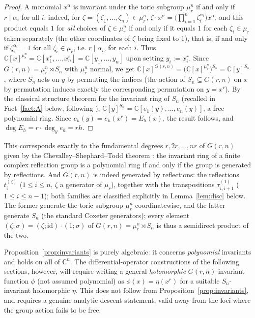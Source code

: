 \documentclass[11pt]{article}
\theoremstyle{remark}
\newcommand{\CC}{\mathbb{C}}
\begin{document}
\begin{proof}
A monomial $x^\alpha$ is invariant under the toric subgroup $\mu_r^n$ if and only if $r\mid \alpha_i$ for all $i$: indeed, for $\zeta=(\zeta_1,\dots,\zeta_n)\in\mu_r^n$, $\zeta\cdot x^\alpha = \big(\prod_{i=1}^n\zeta_i^{\alpha_i}\big)x^\alpha$, and this product equals $1$ for \emph{all} choices of $\zeta\in\mu_r^n$ if and only if it equals $1$ for each $\zeta_i\in\mu_r$ taken separately (the other coordinates of $\zeta$ being fixed to $1$), that is, if and only if $\zeta_i^{\alpha_i}=1$ for all $\zeta_i\in\mu_r$, i.e. $r\mid\alpha_i$, for each $i$. Thus $\CC[x]^{\mu_r^n}=\CC[x_1^r,\dots,x_n^r]=\CC[y_1,\dots,y_n]$ upon setting $y_i:=x_i^r$. Since $G(r,n)=\mu_r^n\rtimes S_n$ with $\mu_r^n$ normal, we get $\CC[x]^{G(r,n)}=\big(\CC[x]^{\mu_r^n}\big)^{S_n}=\CC[y]^{S_n}$, where $S_n$ acts on $y$ by permuting the indices (the action of $S_n\subseteq G(r,n)$ on $x$ by permutation induces exactly the corresponding permutation on $y=x^r$). By the classical structure theorem for the invariant ring of $S_n$ \cite[Ch.~I]{Mac} (recalled in Fact~\ref{fact:A} below, following \cite{Ze}), $\CC[y]^{S_n}=\CC[e_1(y),\dots,e_n(y)]$, a free polynomial ring. Since $e_h(y)=e_h(x^r)=E_h(x)$, the result follows, and $\deg E_h = r\cdot\deg_y e_h = rh$.
\end{proof}

This corresponds exactly to the fundamental degrees $r,2r,\dots,nr$ of $G(r,n)$ given by the Chevalley--Shephard--Todd theorem \cite{ST,Ch}: the invariant ring of a finite complex reflection group is a polynomial ring if and only if the group is generated by reflections. And $G(r,n)$ is indeed generated by reflections: the reflections $t_i^{(\zeta)}$ ($1\le i\le n$, $\zeta$ a generator of $\mu_r$), together with the transpositions $\tau_{i,i+1}^{(1)}$ ($1\le i\le n-1$); both families are classified explicitly in Lemma~\ref{lem:disc} below. The former generate the toric subgroup $\mu_r^n$ coordinatewise, and the latter generate $S_n$ (the standard Coxeter generators); every element $(\zeta;\sigma)=(\zeta;\mathrm{id})\cdot(1;\sigma)$ of $G(r,n)=\mu_r^n\rtimes S_n$ is thus a semidirect product of the two.

Proposition~\ref{prop:invariants} is purely algebraic: it concerns \emph{polynomial} invariants and holds on all of $\CC^n$. The differential-operator constructions of the following sections, however, will require writing a general \emph{holomorphic} $G(r,n)$-invariant function $\phi$ (not assumed polynomial) as $\phi(x)=\eta(x^r)$ for a suitable $S_n$-invariant holomorphic $\eta$. This does not follow from Proposition~\ref{prop:invariants}, and requires a genuine analytic descent statement, valid away from the loci where the group action fails to be free.
\end{document}
